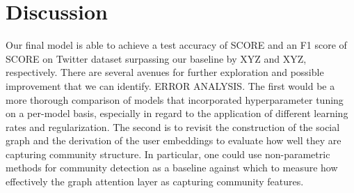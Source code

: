 \documentclass[letterpaper]{article} %
\begin{document}
\section{Discussion}

Our final model is able to achieve a test accuracy of SCORE and an F1 score of SCORE on \citet{Miao2022} Twitter dataset surpassing our baseline by XYZ and XYZ, respectively. There are several avenues for further exploration and possible improvement that we can identify. ERROR ANALYSIS. The first would be a more thorough comparison of models that incorporated hyperparameter tuning on a per-model basis, especially in regard to the application of different learning rates and regularization. The second is to revisit the construction of the social graph and the derivation of the user embeddings to evaluate how well they are capturing community structure. In particular, one could use non-parametric methods for community detection as a baseline against which to measure how effectively the graph attention layer as capturing community features.

\appendix


\end{document}
